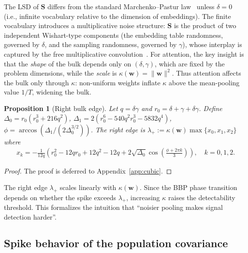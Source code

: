 \documentclass{article}
\def\vw{{\bm{w}}}
\def\mS{{\bm{S}}}
\newtheorem{proposition}{Proposition}
\begin{document}
The LSD of $\mS$ differs from the standard Marchenko--Pastur law~\citep{marvcenko1967distribution} unless $\delta=0$ (i.e., infinite vocabulary relative to the dimension of embeddings). The finite vocabulary introduces a multiplicative noise structure: $\mS$ is the product of two independent Wishart-type components (the embedding table randomness, governed by $\delta$, and the sampling randomness, governed by $\gamma$), whose interplay is captured by the free multiplicative convolution~\citep{nica2006lectures}. For attention, the key insight is that the \emph{shape} of the bulk depends only on $(\delta,\gamma)$, which are fixed by the problem dimensions, while the \emph{scale} is $\kappa(\vw) = \|\vw\|^2$. Thus attention affects the bulk only through $\kappa$: non-uniform weights inflate $\kappa$ above the mean-pooling value $1/T$, widening the bulk.

\begin{proposition}[Right bulk edge]\label{prop:edge}
    Let $q=\delta\gamma$ and $r_0=\delta + \gamma + \delta \gamma$. Define $\Delta_0 = r_0(r_0^3 + 216 q^2)$, $\Delta_1 = 2(r_0^6 - 540 q^2 r_0^3 - 5832 q^4)$, $\phi = \arccos \left( \Delta_1/(2\Delta_0^{3/2}) \right)$. The right edge is $\lambda_+:= \kappa(\vw) \max\{x_0, x_1, x_2\}$ where
    \begin{align*}
        x_k = - \frac{1}{12q} \left( r_0^2 - 12 qr_0 + 12q^2 - 12q + 2 \sqrt{\Delta_0} \cos\!\left( \frac{\phi + 2\pi k}{3} \right) \right), \quad k=0,1,2.
    \end{align*}
\end{proposition}
\begin{proof}
The proof is deferred to Appendix~\ref{app:cubic}.
\end{proof}

The right edge $\lambda_+$ scales linearly with $\kappa(\vw)$. Since the BBP phase transition depends on whether the spike exceeds $\lambda_+$, increasing $\kappa$ raises the detectability threshold. This formalizes the intuition that ``noisier pooling makes signal detection harder''.

\subsection{Spike behavior of the population covariance}\label{sec:spike_pop}
\end{document}

